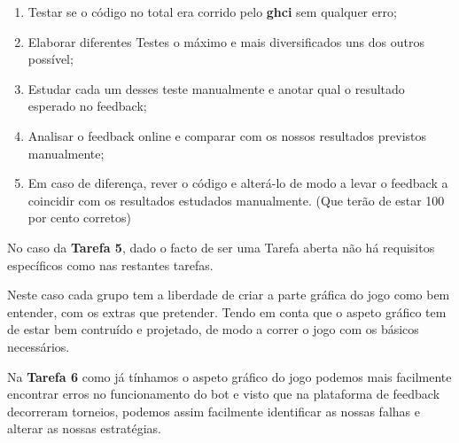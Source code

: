 \documentclass[a4paper]{report} %
\begin{document}
    \begin{enumerate}
        \item Testar se o código no total era corrido pelo \textbf{ghci} sem qualquer erro;
        \item Elaborar diferentes Testes o máximo e mais diversificados uns dos outros possível;
        \item Estudar cada um desses teste manualmente e anotar qual o resultado esperado no feedback;
        \item Analisar o feedback online e comparar com os nossos resultados previstos manualmente;
        \item Em caso de diferença, rever o código e alterá-lo de modo a levar o feedback a coincidir com os resultados estudados manualmente. (Que terão de estar 100 por cento corretos)
        
    \end{enumerate}
                     
                     \vspace{1.8mm}
                     \vspace{1.8mm}
                     \vspace{1.8mm}
                     \vspace{1.8mm}
                     \vspace{1.8mm}
    \large {
    \par No caso da \textbf{Tarefa 5}, dado o facto de ser uma Tarefa aberta não há requisitos específicos como nas restantes tarefas. 
    \par Neste caso cada grupo tem a liberdade de criar a parte gráfica do jogo como bem entender, com os extras que pretender. Tendo em conta que o aspeto gráfico tem de estar bem contruído e projetado, de modo a correr o jogo com os básicos necessários.
            \vspace{1.8mm}
            \vspace{1.8mm}
            \vspace{1.8mm}
   \par Na \textbf{Tarefa 6} como já tínhamos o aspeto gráfico do jogo podemos mais facilmente encontrar erros no funcionamento do bot e visto que na plataforma de feedback decorreram torneios, podemos assim facilmente identificar as nossas falhas e alterar as nossas estratégias.  
 }
                     \vspace{1.8mm}
                     \vspace{1.8mm}
                     \vspace{1.8mm}
                     \vspace{1.8mm}
                     \vspace{1.8mm}
                     
\end{document}
